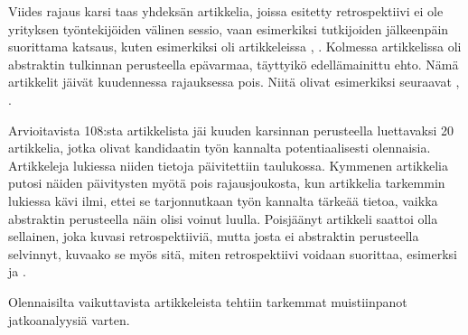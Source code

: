 Viides rajaus karsi taas yhdeksän artikkelia, joissa esitetty retrospektiivi ei ole yrityksen työntekijöiden välinen sessio, vaan esimerkiksi tutkijoiden jälkeenpäin suorittama katsaus, kuten esimerkiksi oli artikkeleissa \citep{wolforth2010generalizable}, \citep{ardimento2004multiview}. Kolmessa artikkelissa oli abstraktin tulkinnan perusteella epävarmaa, täyttyikö edellämainittu ehto. Nämä artikkelit jäivät kuudennessa rajauksessa pois. Niitä olivat esimerkiksi seuraavat \citep{xu2012enabling}, \citep{grady1996software}. 

Arvioitavista 108:sta artikkelista jäi kuuden karsinnan perusteella luettavaksi 20 artikkelia, jotka olivat kandidaatin työn kannalta potentiaalisesti olennaisia. Artikkeleja lukiessa niiden tietoja päivitettiin taulukossa. Kymmenen artikkelia putosi näiden päivitysten myötä pois rajausjoukosta, kun artikkelia tarkemmin lukiessa kävi ilmi, ettei se tarjonnutkaan työn kannalta tärkeää tietoa, vaikka abstraktin perusteella näin olisi voinut luulla. Poisjäänyt artikkeli saattoi olla sellainen, joka kuvasi retrospektiiviä, mutta josta ei abstraktin perusteella selvinnyt, kuvaako se myös sitä, miten retrospektiivi voidaan suorittaa, esimerksi \citep{glass2002loyal} ja \citep{drury2012obstacles}.

Olennaisilta vaikuttavista artikkeleista tehtiin tarkemmat muistiinpanot jatkoanalyysiä varten.

